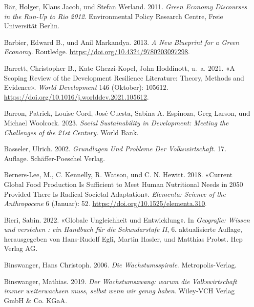 \documentclass[
  nswissgerman,
  a4paper,
  openany]{book}
\newlength{\cslhangindent}
\newenvironment{CSLReferences}[2] %
 {\begin{list}{}{%
  \setlength{\itemindent}{0pt}
  \setlength{\leftmargin}{0pt}
  \setlength{\parsep}{0pt}
  \ifodd #1
   \setlength{\leftmargin}{\cslhangindent}
   \setlength{\itemindent}{-1\cslhangindent}
  \fi
  \setlength{\itemsep}{#2\baselineskip}}}
 {\end{list}}
\begin{document}
\begin{CSLReferences}{1}{1}
Bär, Holger, Klaus Jacob, und Stefan Werland. 2011. \emph{Green {Economy
Discourses} in the {Run-Up} to {Rio} 2012}. Environmental Policy
Research Centre, Freie Universität Berlin.

Barbier, Edward B., und Anil Markandya. 2013. \emph{A {New Blueprint}
for a {Green Economy}}. Routledge.
\url{https://doi.org/10.4324/9780203097298}.

Barrett, Christopher B., Kate Ghezzi-Kopel, John Hoddinott, u.~a. 2021.
{«A Scoping Review of the Development Resilience Literature: {Theory},
Methods and Evidence»}. \emph{World Development} 146 (Oktober): 105612.
\url{https://doi.org/10.1016/j.worlddev.2021.105612}.

Barron, Patrick, Louise Cord, José Cuesta, Sabina A. Espinoza, Greg
Larson, und Michael Woolcock. 2023. \emph{Social {Sustainability} in
{Development}: {Meeting} the {Challenges} of the 21st {Century}}. World
Bank.

Basseler, Ulrich. 2002. \emph{Grundlagen Und {Probleme} Der
{Volkswirtschaft}}. 17. Auflage. Sch{ä}ffer-Poeschel Verlag.

Berners-Lee, M., C. Kennelly, R. Watson, und C. N. Hewitt. 2018.
{«Current Global Food Production Is Sufficient to Meet Human Nutritional
Needs in 2050 Provided There Is Radical Societal Adaptation»}.
\emph{Elementa: Science of the Anthropocene} 6 (Januar): 52.
\url{https://doi.org/10.1525/elementa.310}.

Bieri, Sabin. 2022. {«Globale {Ungleichheit} und {Entwicklung}»}. In
\emph{Geografie: {Wissen} und verstehen : ein {Handbuch} für die
{Sekundarstufe} {II}}, 6. aktualisierte Auflage, herausgegeben von
Hans-Rudolf Egli, Martin Hasler, und Matthias Probst. Hep Verlag AG.

Binswanger, Hans Christoph. 2006. \emph{Die {Wachstumsspirale}}.
Metropolis-Verlag.

Binswanger, Mathias. 2019. \emph{{Der Wachstumszwang: warum die
Volkswirtschaft immer weiterwachsen muss, selbst wenn wir genug haben}}.
Wiley-VCH Verlag GmbH \& Co. KGaA.


\end{CSLReferences}
\end{document}
